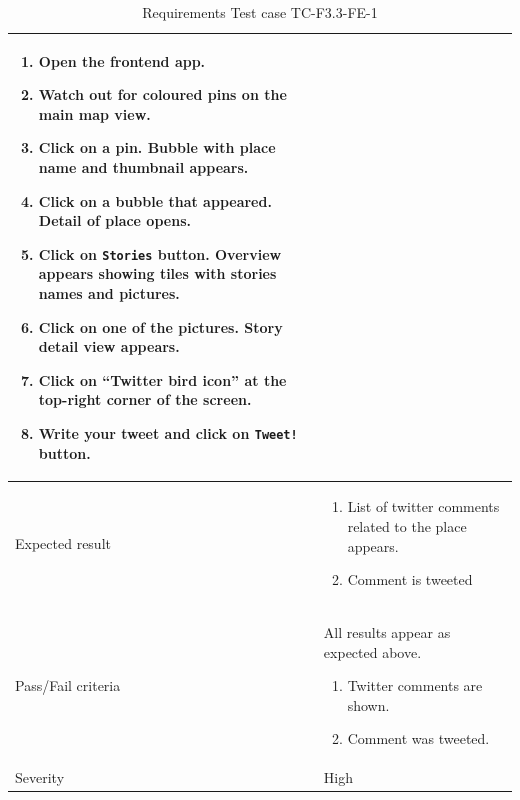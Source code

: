 \documentclass[11pt]{book}
\begin{document}
\begin{table}
\begin{tabular}{| p{3cm} | p{9.5cm} |}
                            \begin{enumerate}
                              \item Open the frontend app.
                              \item Watch out for coloured pins on the main map view.
                              \item Click on a pin. Bubble with place name and thumbnail appears.
                              \item Click on a bubble that appeared. Detail of place opens.
                              \item Click on \texttt{Stories} button. Overview appears showing tiles with stories names and pictures.
                              \item Click on one of the pictures. Story detail view appears.
                              \item Click on ``Twitter bird icon'' at the top-right corner of the screen.
                              \item Write your tweet and click on \texttt{Tweet!} button.
                            \end{enumerate} \\ \hline 
    Expected result       & \begin{enumerate}
                              \item List of twitter comments related to the place appears.
                              \item Comment is tweeted
                            \end{enumerate} \\ \hline 
    Pass/Fail criteria    & All results appear as expected above.
                            \begin{enumerate}
                              \item Twitter comments are shown.
                              \item Comment was tweeted.
                            \end{enumerate} \\ \hline 
    Severity              & High \\ \hline 
  \end{tabular}
  \caption{Requirements Test case TC-F3.3-FE-1}
  \label{tab:TCF3.3FE1}
\end{table}
\end{document}
